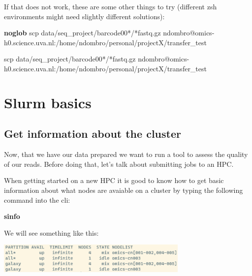 \documentclass[
  letterpaper,
  DIV=11,
  numbers=noendperiod]{scrreprt}
\newenvironment{Shaded}{}{}
\newcommand{\ExtensionTok}[1]{\textcolor[rgb]{0.84,0.23,0.29}{\textbf{#1}}}
\newcommand{\FunctionTok}[1]{\textcolor[rgb]{0.44,0.26,0.76}{#1}}
\newcommand{\NormalTok}[1]{\textcolor[rgb]{0.14,0.16,0.18}{#1}}
\newcommand{\PreprocessorTok}[1]{\textcolor[rgb]{0.84,0.23,0.29}{#1}}
\newcommand{\StringTok}[1]{\textcolor[rgb]{0.01,0.18,0.38}{#1}}
\begin{document}
\begin{tcolorbox}
If that does not work, these are some other things to try (different zsh
environments might need slightly different solutions):

\begin{Shaded}
\begin{Highlighting}[]
\ExtensionTok{noglob}\NormalTok{ scp  data/seq\_project/barcode00}\PreprocessorTok{*}\NormalTok{/}\PreprocessorTok{*}\NormalTok{fastq.gz ndombro@omics{-}h0.science.uva.nl:/home/ndombro/personal/projectX/transfer\_test}

\FunctionTok{scp}  \StringTok{\textquotesingle{}data/seq\_project/barcode00*/*fastq.gz\textquotesingle{}}\NormalTok{ ndombro@omics{-}h0.science.uva.nl:/home/ndombro/personal/projectX/transfer\_test}
\end{Highlighting}
\end{Shaded}

\end{tcolorbox}

\section{Slurm basics}\label{slurm-basics}

\subsection{Get information about the
cluster}\label{get-information-about-the-cluster}

Now, that we have our data prepared we want to run a tool to assess the
quality of our reads. Before doing that, let's talk about submitting
jobs to an HPC.

When getting started on a new HPC it is good to know how to get basic
information about what nodes are avaiable on a cluster by typing the
following command into the cli:

\begin{Shaded}
\begin{Highlighting}[]
\ExtensionTok{sinfo}
\end{Highlighting}
\end{Shaded}

We will see something like this:

\begin{center}
\includegraphics[width=0.7\textwidth,height=\textheight]{../img/sinfo.png}
\end{center}
\end{document}
